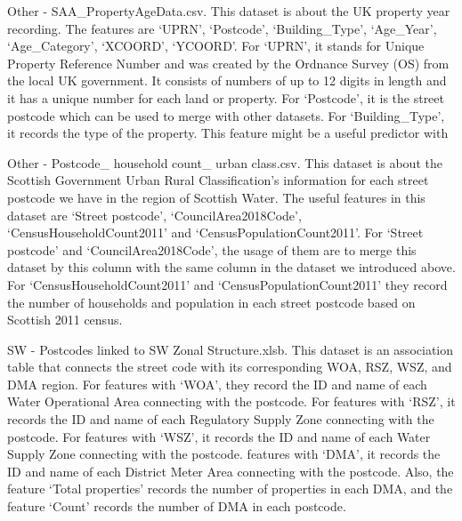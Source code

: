 \documentclass[11pt,twoside]{article}
\numberwithin{Theorem}{section}
\numberwithin{Definition}{section}
\numberwithin{Lemma}{section}
\numberwithin{Algorithm}{section}
\numberwithin{equation}{section}
\begin{document}
\begin{enumerate}
Other - SAA_PropertyAgeData.csv. This dataset is about the UK property year recording. The features are ‘UPRN’, ‘Postcode’, ‘Building\_Type’, ‘Age\_Year’, ‘Age\_Category’, ‘XCOORD’, ‘YCOORD’. For ‘UPRN’, it stands for Unique Property Reference Number and was created by the Ordnance Survey (OS) from the local UK government. It consists of numbers of up to 12 digits in length and it has a unique number for each land or property. For ‘Postcode’, it is the street postcode which can be used to merge with other datasets. For ‘Building_Type’, it records the type of the property. This feature might be a useful predictor with %

Other - Postcode\_ household count\_ urban class.csv. This dataset is about the Scottish Government Urban Rural Classification’s information for each street postcode we have in the region of Scottish Water. The useful features in this dataset are ‘Street postcode’, ‘CouncilArea2018Code’, ‘CensusHouseholdCount2011’ and ‘CensusPopulationCount2011’. For ‘Street postcode’ and ‘CouncilArea2018Code’, the usage of them are to merge this dataset by this column with the same column in the dataset we introduced above. For ‘CensusHouseholdCount2011’ and ‘CensusPopulationCount2011’ they record the number of households and population in each street postcode based on Scottish 2011 census.

SW - Postcodes linked to SW Zonal Structure.xlsb. This dataset is an association table that connects the street code with its corresponding WOA, RSZ, WSZ, and DMA region. For features with ‘WOA’, they record the ID and name of each Water Operational Area connecting with the postcode. For features with ‘RSZ’, it records the ID and name of each Regulatory Supply Zone connecting with the postcode. For features with ‘WSZ’, it records the ID and name of each Water Supply Zone connecting with the postcode. features with ‘DMA’, it records the ID and name of each District Meter Area connecting with the postcode. Also, the feature ‘Total properties’ records the number of properties in each DMA, and the feature ‘Count’ records the number of DMA in each postcode.

\end{enumerate}
\end{document}
